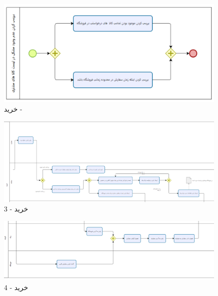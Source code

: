\documentclass[12pt,a4paper]{article}
\begin{document}
	\pagebreak
	\begin{figure}[h!]
		\begin{center}
			\includegraphics[width=14cm]{images/Bizagi Buy Sub-Process.png}	
		\end{center}
		\caption{خرید - }
	\end{figure}
	\begin{figure}[h!]
		\begin{center}
			\includegraphics[width=14cm]{images/Bizagi Buy 3.png}	
		\end{center}
		\caption{خرید - 3}
	\end{figure}
	\begin{figure}[h!]
		\begin{center}
			\includegraphics[width=14cm]{images/Bizagi Buy 4.png}	
		\end{center}
		\caption{خرید - 4}
	\end{figure}
	\pagebreak
\end{document}
